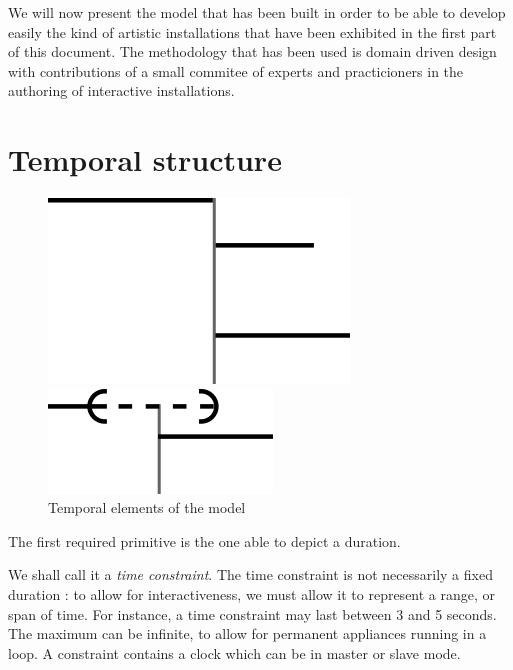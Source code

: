 \documentclass{sigchi}
\begin{document}
We will now present the model that has been built in order to be able to develop easily the kind of artistic installations that have been exhibited in the first part of this document. The methodology that has been used is domain driven design with contributions of a small commitee of experts and practicioners in the authoring of interactive installations. 
\section{Temporal structure}\label{sec.temporal}
\begin{figure}[h]
    \centering
    \begin{minipage}[b]{.5\linewidth}
        \centering
        \includegraphics[scale=0.6]{images/timenode.png}
    \end{minipage}\begin{minipage}[b]{.5\linewidth}
    \centering
    \includegraphics[scale=0.6]{images/souple.png}
\end{minipage}	

\caption{Temporal elements of the model}
\label{fig.cst.timenode}
\end{figure}	

The first required primitive is the one able to depict a duration.

We shall call it a \textit{time constraint}.
The time constraint is not necessarily a fixed duration : to allow for interactiveness, 
we must allow it to represent a range, or span of time. For instance, a time constraint may last between 3 and 5 seconds. The maximum can be infinite, to allow for permanent appliances running in a loop. A constraint contains a clock which can be in master or slave mode.
\end{document}
